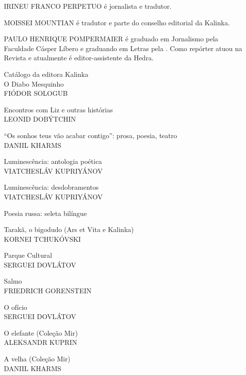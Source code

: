 \medskip

\noindent{}IRINEU FRANCO PERPETUO é jornalista e tradutor.


\medskip

\noindent{}MOISSEI MOUNTIAN é tradutor e parte do conselho editorial da Kalinka.

\medskip

\noindent{}PAULO HENRIQUE POMPERMAIER é graduado em Jornalismo pela Faculdade Cásper Líbero e graduando em Letras pela . Como repórter atuou na Revista  e atualmente é editor-assistente da Hedra.

\afterpage{\blankpage}

\newpage
\pagestyle{empty}
\MyriadPro

\noindent{}Catálogo da editora Kalinka\\[5pt]

\noindent{}O Diabo Mesquinho\\
FIÓDOR SOLOGUB
\medskip

\noindent{}Encontros com Liz e outras histórias\\
LEONID DOBÝTCHIN
\medskip

\noindent{}``Os sonhos teus vão acabar contigo'': prosa, poesia, teatro\\
DANIIL KHARMS
\medskip

\noindent{}Luminescência: antologia poética\\
VIATCHESLÁV KUPRIYÁNOV
\medskip

\noindent{}Luminescência: desdobramentos\\
VIATCHESLÁV KUPRIYÁNOV
\medskip

\noindent{}Poesia russa: seleta bilíngue
\medskip

\noindent{}Tarakã, o bigodudo (Ars et Vita e Kalinka)\\
KORNEI TCHUKÓVSKI
\medskip

\noindent{}Parque Cultural\\
SERGUEI DOVLÁTOV
\medskip

\noindent{}Salmo\\
FRIEDRICH GORENSTEIN
\medskip

\noindent{}O ofício\\
SERGUEI DOVLÁTOV
\medskip

\noindent{}O elefante (Coleção Mir)\\
ALEKSANDR KUPRIN
\medskip

\noindent{}A velha (Coleção Mir)\\
DANIIL KHARMS 
\medskip


